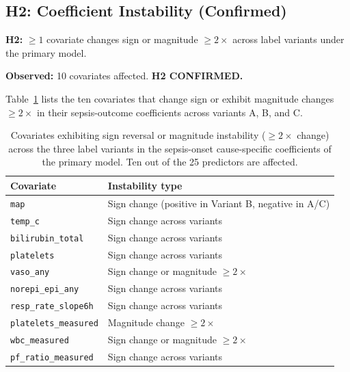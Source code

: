 \subsection{H2: Coefficient Instability (Confirmed)}

\begin{mdframed}[backgroundcolor=ATUSand!30, linecolor=ATUGreen]
  \textbf{H2:} $\geq 1$ covariate changes sign or magnitude $\geq 2\times$ across
  label variants under the primary model.

  \textbf{Observed:} 10 covariates affected.
  \textbf{H2 CONFIRMED.}
\end{mdframed}

Table~\ref{tab:coef_instability} lists the ten covariates that change sign or
exhibit magnitude changes $\geq 2\times$ in their sepsis-outcome coefficients
across variants A, B, and C.

\begin{table}[H]
  \centering
  \begin{tabular}{lp{8cm}}
    \toprule
    \textbf{Covariate} & \textbf{Instability type} \\
    \midrule
    \texttt{map}                  & Sign change (positive in Variant B, negative in A/C) \\
    \texttt{temp\_c}              & Sign change across variants \\
    \texttt{bilirubin\_total}     & Sign change across variants \\
    \texttt{platelets}            & Sign change across variants \\
    \texttt{vaso\_any}            & Sign change or magnitude $\geq 2\times$ \\
    \texttt{norepi\_epi\_any}     & Sign change across variants \\
    \texttt{resp\_rate\_slope6h}  & Sign change across variants \\
    \texttt{platelets\_measured}  & Magnitude change $\geq 2\times$ \\
    \texttt{wbc\_measured}        & Sign change or magnitude $\geq 2\times$ \\
    \texttt{pf\_ratio\_measured}  & Sign change across variants \\
    \bottomrule
  \end{tabular}
  \caption{Covariates exhibiting sign reversal or magnitude instability
  ($\geq 2\times$ change) across the three label variants in the sepsis-onset
  cause-specific coefficients of the primary model. Ten out of the 25 predictors
  are affected.}
  \label{tab:coef_instability}
\end{table}

